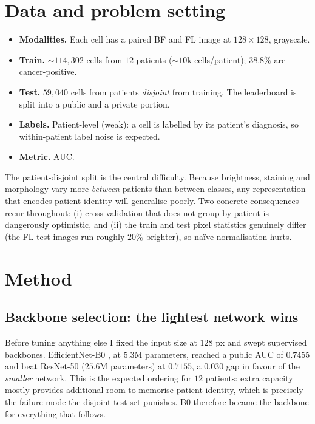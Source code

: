 \documentclass[11pt]{article}
\begin{document}
\section{Data and problem setting}

\begin{itemize}
  \item \textbf{Modalities.} Each cell has a paired BF and FL image at $128\times128$, grayscale.
  \item \textbf{Train.} $\sim\!114{,}302$ cells from $12$ patients ($\sim\!10$k cells/patient);
        $38.8\%$ are cancer-positive.
  \item \textbf{Test.} $59{,}040$ cells from patients \emph{disjoint} from training. The leaderboard is
        split into a public and a private portion.
  \item \textbf{Labels.} Patient-level (weak): a cell is labelled by its patient's diagnosis, so
        within-patient label noise is expected.
  \item \textbf{Metric.} AUC.
\end{itemize}

The patient-disjoint split is the central difficulty. Because brightness, staining and morphology vary more
\emph{between} patients than between classes, any representation that encodes patient identity will
generalise poorly. Two concrete consequences recur throughout: (i) cross-validation that does not group
by patient is dangerously optimistic, and (ii) the train and test pixel statistics genuinely differ
(the FL test images run roughly $20\%$ brighter), so na\"ive normalisation hurts.

\section{Method}

\subsection{Backbone selection: the lightest network wins}

Before tuning anything else I fixed the input size at $128$ px and swept supervised backbones.
EfficientNet-B0 \citep{tan2019}, at $5.3$M parameters, reached a public AUC of $0.7455$ and beat
ResNet-50 ($25.6$M parameters) at $0.7155$, a $0.030$ gap in favour of the \emph{smaller} network.
This is the expected ordering for $12$ patients: extra capacity mostly provides additional room to
memorise patient identity, which is precisely the failure mode the disjoint test set punishes. B0
therefore became the backbone for everything that follows.
\end{document}
